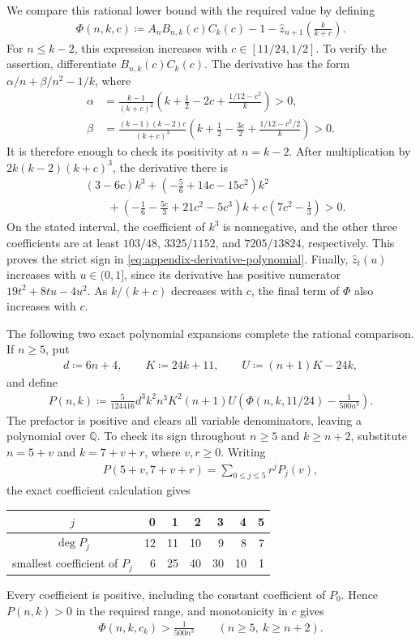We compare this rational lower bound with the required value by defining
\begin{align*}
\Phi(n,k,c)\coloneqq A_nB_{n,k}(c)C_k(c)-1
-\widehat z_{n+1}\left(\frac{k}{k+c}\right).
\end{align*}
For $n\le k-2$, this expression increases with $c\in[11/24,1/2]$. To verify the assertion, differentiate $B_{n,k}(c)C_k(c)$. The derivative has the form $\alpha/n+\beta/n^2-1/k$, where
\begin{align*}
\alpha&=\frac{k-1}{(k+c)^2}
\left(k+\frac12-2c+\frac{1/12-c^2}{k}\right)>0,\\
\beta&=\frac{(k-1)(k-2)c}{(k+c)^3}
\left(k+\frac12-\frac{3c}{2}+\frac{1/12-c^2/2}{k}\right)>0.
\end{align*}
It is therefore enough to check its positivity at $n=k-2$. After multiplication by $2k(k-2)(k+c)^3$, the derivative there is
\begin{align}\label{eq:appendix-derivative-polynomial}
&(3-6c)k^3+\left(-\frac56+14c-15c^2\right)k^2\nonumber\\
&\qquad+\left(-\frac16-\frac{5c}{3}+21c^2-5c^3\right)k
+c\left(7c^2-\frac13\right)>0.
\end{align}
On the stated interval, the coefficient of $k^3$ is nonnegative, and the other three coefficients are at least $103/48$, $3325/1152$, and $7205/13824$, respectively. This proves the strict sign in \cref{eq:appendix-derivative-polynomial}. Finally, $\widehat z_t(u)$ increases with $u\in(0,1]$, since its derivative has positive numerator $19t^2+8tu-4u^2$. As $k/(k+c)$ decreases with $c$, the final term of $\Phi$ also increases with $c$.

The following two exact polynomial expansions complete the rational comparison. If $n\ge5$, put
\begin{align*}
d\coloneqq6n+4,\qquad K\coloneqq24k+11,\qquad U\coloneqq(n+1)K-24k,
\end{align*}
and define
\begin{align}\label{eq:appendix-big-polynomial}
P(n,k)\coloneqq
\frac5{124416}d^3k^2n^3K^2(n+1)U
\left(\Phi(n,k,11/24)-\frac1{500n^3}\right).
\end{align}
The prefactor is positive and clears all variable denominators, leaving a polynomial over $\mathbb Q$. To check its sign throughout $n\ge5$ and $k\ge n+2$, substitute $n=5+v$ and $k=7+v+r$, where $v,r\ge0$. Writing
\begin{align*}
P(5+v,7+v+r)=\sum_{0\le j\le5}r^jP_j(v),
\end{align*}
the exact coefficient calculation gives
\begin{center}
\begin{tabular}{c|rrrrrr}
$j$&0&1&2&3&4&5\\\hline
$\deg P_j$&12&11&10&9&8&7\\
smallest coefficient of $P_j$&6&25&40&30&10&1
\end{tabular}
\end{center}
Every coefficient is positive, including the constant coefficient of $P_0$. Hence $P(n,k)>0$ in the required range, and monotonicity in $c$ gives
\begin{align*}
\Phi(n,k,c_k)>\frac1{500n^3}\qquad(n\ge5,\ k\ge n+2).
\end{align*}

